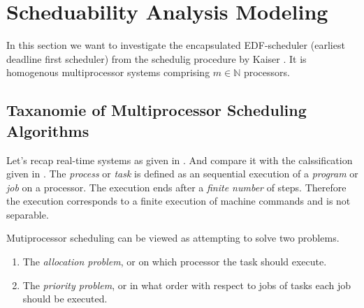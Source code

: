 \section{Scheduability Analysis Modeling}









In this section we want to investigate the encapsulated EDF-scheduler (earliest deadline first scheduler) from the schedulig procedure by Kaiser \cite{K}. It is homogenous multiprocessor systems comprising $m\in \mathbb{N}$ processors.\\

\subsection{Taxanomie of Multiprocessor Scheduling Algorithms}

Let's recap \glspl{real-time system} as given in \cite{KBK}.
And compare it with the calssification given in \cite[section 2.3]{DB2011}.
The {\itshape process} or {\itshape task} is defined as an sequential execution of a {\itshape program}  or {\itshape job} on a processor.
The execution ends after a \emph{finite number} of steps.
Therefore the execution corresponds to a finite execution of machine commands and is not separable.\\

\begin{lemma}
	\label{remark:problems}
	Mutiprocessor scheduling can be viewed as attempting  to solve two problems.
	\begin{enumerate}[label=(\roman*)]
		\item The \emph{allocation problem}, or on which processor the task should execute.
		\label{remark:allocationproblem}
		\item The \emph{priority problem}, or in what order with respect to jobs of tasks each job should be executed.
		\label{remark:priorityproblem}
	\end{enumerate}
\end{lemma}


